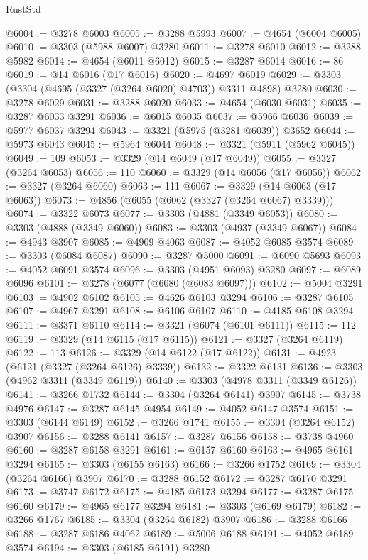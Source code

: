 \begin{lexlean}{RustStd}
\begin{coremodule}
@6004 := @3278 @6003
@6005 := @3288 @5993
@6007 := @4654 (@6004 @6005)
@6010 := @3303 (@5988 @6007) @3280
@6011 := @3278 @6010
@6012 := @3288 @5982
@6014 := @4654 (@6011 @6012)
@6015 := @3287 @6014
@6016 := 86
@6019 := @14 @6016 (@17 @6016)
@6020 := @4697 @6019
@6029 := @3303 (@3304 (@4695 (@3327 (@3264 @6020) @4703)) @3311 @4898) @3280
@6030 := @3278 @6029
@6031 := @3288 @6020
@6033 := @4654 (@6030 @6031)
@6035 := @3287 @6033 @3291
@6036 := @6015 @6035
@6037 := @5966 @6036
@6039 := @5977 @6037 @3294
@6043 := @3321 (@5975 (@3281 @6039)) @3652
@6044 := @5973 @6043
@6045 := @5964 @6044
@6048 := @3321 (@5911 (@5962 @6045))
@6049 := 109
@6053 := @3329 (@14 @6049 (@17 @6049))
@6055 := @3327 (@3264 @6053)
@6056 := 110
@6060 := @3329 (@14 @6056 (@17 @6056))
@6062 := @3327 (@3264 @6060)
@6063 := 111
@6067 := @3329 (@14 @6063 (@17 @6063))
@6073 := @4856 (@6055 (@6062 (@3327 (@3264 @6067) @3339)))
@6074 := @3322 @6073
@6077 := @3303 (@4881 (@3349 @6053))
@6080 := @3303 (@4888 (@3349 @6060))
@6083 := @3303 (@4937 (@3349 @6067))
@6084 := @4943 @3907
@6085 := @4909 @4063
@6087 := @4052 @6085 @3574
@6089 := @3303 (@6084 @6087)
@6090 := @3287 @5000
@6091 := @6090 @5693
@6093 := @4052 @6091 @3574
@6096 := @3303 (@4951 @6093) @3280
@6097 := @6089 @6096
@6101 := @3278 (@6077 (@6080 (@6083 @6097)))
@6102 := @5004 @3291
@6103 := @4902 @6102
@6105 := @4626 @6103 @3294
@6106 := @3287 @6105
@6107 := @4967 @3291
@6108 := @6106 @6107
@6110 := @4185 @6108 @3294
@6111 := @3371 @6110
@6114 := @3321 (@6074 (@6101 @6111))
@6115 := 112
@6119 := @3329 (@14 @6115 (@17 @6115))
@6121 := @3327 (@3264 @6119)
@6122 := 113
@6126 := @3329 (@14 @6122 (@17 @6122))
@6131 := @4923 (@6121 (@3327 (@3264 @6126) @3339))
@6132 := @3322 @6131
@6136 := @3303 (@4962 @3311 (@3349 @6119))
@6140 := @3303 (@4978 @3311 (@3349 @6126))
@6141 := @3266 @1732
@6144 := @3304 (@3264 @6141) @3907
@6145 := @3738 @4976
@6147 := @3287 @6145 @4954
@6149 := @4052 @6147 @3574
@6151 := @3303 (@6144 @6149)
@6152 := @3266 @1741
@6155 := @3304 (@3264 @6152) @3907
@6156 := @3288 @6141
@6157 := @3287 @6156
@6158 := @3738 @4960
@6160 := @3287 @6158 @3291
@6161 := @6157 @6160
@6163 := @4965 @6161 @3294
@6165 := @3303 (@6155 @6163)
@6166 := @3266 @1752
@6169 := @3304 (@3264 @6166) @3907
@6170 := @3288 @6152
@6172 := @3287 @6170 @3291
@6173 := @3747 @6172
@6175 := @4185 @6173 @3294
@6177 := @3287 @6175 @6160
@6179 := @4965 @6177 @3294
@6181 := @3303 (@6169 @6179)
@6182 := @3266 @1767
@6185 := @3304 (@3264 @6182) @3907
@6186 := @3288 @6166
@6188 := @3287 @6186 @4062
@6189 := @5006 @6188
@6191 := @4052 @6189 @3574
@6194 := @3303 (@6185 @6191) @3280

\end{coremodule}
\end{lexlean}
